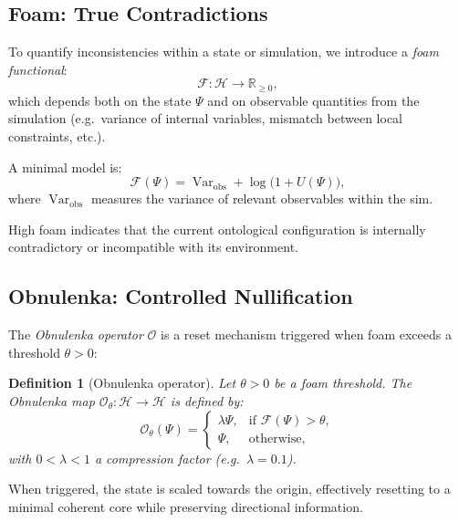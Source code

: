 \documentclass[11pt,a4paper]{article}
\newtheorem{definition}{Definition}
\begin{document}
\subsection{Foam: True Contradictions}
To quantify inconsistencies within a state or simulation,
we introduce a \emph{foam functional}:
\begin{equation}
  \mathcal{F}: \mathcal{H} \to \mathbb{R}_{\ge 0},
\end{equation}
which depends both on the state $\Psi$ and on observable quantities
from the simulation (e.g.\ variance of internal variables,
mismatch between local constraints, etc.).

A minimal model is:
\begin{equation}
  \mathcal{F}(\Psi)
  = \operatorname{Var}_{\text{obs}} + \log\bigl(1 + U(\Psi)\bigr),
  \label{eq:foam}
\end{equation}
where $\operatorname{Var}_{\text{obs}}$ measures the variance
of relevant observables within the sim.

High foam indicates that the current ontological configuration
is internally contradictory or incompatible with its environment.

\subsection{Obnulenka: Controlled Nullification}
The \emph{Obnulenka operator} $\mathcal{O}$ is a reset mechanism
triggered when foam exceeds a threshold $\theta > 0$:
\begin{definition}[Obnulenka operator]
Let $\theta > 0$ be a foam threshold.
The Obnulenka map $\mathcal{O}_\theta: \mathcal{H} \to \mathcal{H}$ is defined by:
\[
  \mathcal{O}_\theta(\Psi) =
  \begin{cases}
    \lambda \Psi, & \text{if } \mathcal{F}(\Psi) > \theta, \\
    \Psi,        & \text{otherwise},
  \end{cases}
\]
with $0 < \lambda < 1$ a compression factor (e.g.\ $\lambda = 0.1$).
\end{definition}
When triggered, the state is scaled towards the origin,
effectively resetting to a minimal coherent core while preserving
directional information.

\end{document}
